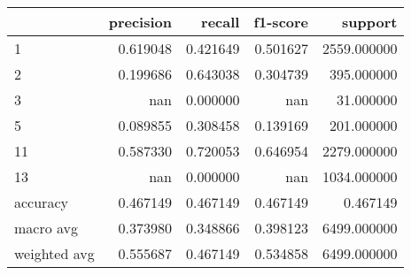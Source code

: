 \begin{tabular}{lrrrr}
\toprule
 & precision & recall & f1-score & support \\
\midrule
1 & 0.619048 & 0.421649 & 0.501627 & 2559.000000 \\
2 & 0.199686 & 0.643038 & 0.304739 & 395.000000 \\
3 & nan & 0.000000 & nan & 31.000000 \\
5 & 0.089855 & 0.308458 & 0.139169 & 201.000000 \\
11 & 0.587330 & 0.720053 & 0.646954 & 2279.000000 \\
13 & nan & 0.000000 & nan & 1034.000000 \\
accuracy & 0.467149 & 0.467149 & 0.467149 & 0.467149 \\
macro avg & 0.373980 & 0.348866 & 0.398123 & 6499.000000 \\
weighted avg & 0.555687 & 0.467149 & 0.534858 & 6499.000000 \\
\bottomrule
\end{tabular}
